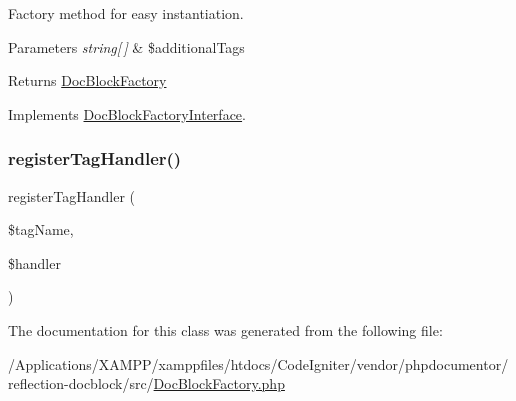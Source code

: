 Factory method for easy instantiation.


\begin{DoxyParams}{Parameters}
{\em string\mbox{[}$\,$\mbox{]}} & \$additional\+Tags\\
\hline
\end{DoxyParams}
\begin{DoxyReturn}{Returns}
\mbox{\hyperlink{classphp_documentor_1_1_reflection_1_1_doc_block_factory}{Doc\+Block\+Factory}} 
\end{DoxyReturn}


Implements \mbox{\hyperlink{interfacephp_documentor_1_1_reflection_1_1_doc_block_factory_interface_a220aa312016b6fa0c9a6c4bf61a7ead4}{Doc\+Block\+Factory\+Interface}}.

\mbox{\label{classphp_documentor_1_1_reflection_1_1_doc_block_factory_ab57c71828fcf271fc43f9422ca1163d2}} 
\subsubsection{\texorpdfstring{register\+Tag\+Handler()}{registerTagHandler()}}
{\footnotesize\ttfamily register\+Tag\+Handler (\begin{DoxyParamCaption}\item[{}]{\$tag\+Name,  }\item[{}]{\$handler }\end{DoxyParamCaption})}



The documentation for this class was generated from the following file\+:\begin{DoxyCompactItemize}
\item 
/\+Applications/\+X\+A\+M\+P\+P/xamppfiles/htdocs/\+Code\+Igniter/vendor/phpdocumentor/reflection-\/docblock/src/\mbox{\hyperlink{_doc_block_factory_8php}{Doc\+Block\+Factory.\+php}}\end{DoxyCompactItemize}
